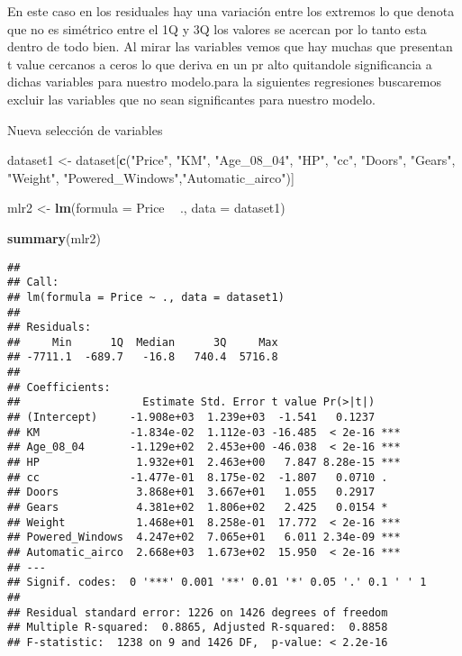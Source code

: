 \documentclass[
]{article}
\newenvironment{Shaded}{\begin{snugshade}}{\end{snugshade}}
\newcommand{\DataTypeTok}[1]{\textcolor[rgb]{0.13,0.29,0.53}{#1}}
\newcommand{\KeywordTok}[1]{\textcolor[rgb]{0.13,0.29,0.53}{\textbf{#1}}}
\newcommand{\NormalTok}[1]{#1}
\newcommand{\OperatorTok}[1]{\textcolor[rgb]{0.81,0.36,0.00}{\textbf{#1}}}
\newcommand{\StringTok}[1]{\textcolor[rgb]{0.31,0.60,0.02}{#1}}
\begin{document}
En este caso en los residuales hay una variación entre los extremos lo
que denota que no es simétrico entre el 1Q y 3Q los valores se acercan
por lo tanto esta dentro de todo bien. Al mirar las variables vemos que
hay muchas que presentan t value cercanos a ceros lo que deriva en un pr
alto quitandole significancia a dichas variables para nuestro
modelo.para la siguientes regresiones buscaremos excluir las variables
que no sean significantes para nuestro modelo.

Nueva selección de variables

\begin{Shaded}
\begin{Highlighting}[]
\NormalTok{dataset1 <-}\StringTok{ }\NormalTok{dataset[}\KeywordTok{c}\NormalTok{(}\StringTok{"Price"}\NormalTok{, }\StringTok{"KM"}\NormalTok{, }\StringTok{"Age_08_04"}\NormalTok{, }\StringTok{"HP"}\NormalTok{, }\StringTok{"cc"}\NormalTok{, }\StringTok{"Doors"}\NormalTok{, }\StringTok{"Gears"}\NormalTok{, }\StringTok{"Weight"}\NormalTok{,}
                      \StringTok{"Powered_Windows"}\NormalTok{,}\StringTok{"Automatic_airco"}\NormalTok{)]}
\end{Highlighting}
\end{Shaded}

\begin{Shaded}
\begin{Highlighting}[]
\NormalTok{mlr2 <-}\StringTok{ }\KeywordTok{lm}\NormalTok{(}\DataTypeTok{formula =}\NormalTok{ Price }\OperatorTok{~}\StringTok{ }\NormalTok{., }\DataTypeTok{data =}\NormalTok{  dataset1)}

\KeywordTok{summary}\NormalTok{(mlr2)}
\end{Highlighting}
\end{Shaded}

\begin{verbatim}
## 
## Call:
## lm(formula = Price ~ ., data = dataset1)
## 
## Residuals:
##     Min      1Q  Median      3Q     Max 
## -7711.1  -689.7   -16.8   740.4  5716.8 
## 
## Coefficients:
##                   Estimate Std. Error t value Pr(>|t|)    
## (Intercept)     -1.908e+03  1.239e+03  -1.541   0.1237    
## KM              -1.834e-02  1.112e-03 -16.485  < 2e-16 ***
## Age_08_04       -1.129e+02  2.453e+00 -46.038  < 2e-16 ***
## HP               1.932e+01  2.463e+00   7.847 8.28e-15 ***
## cc              -1.477e-01  8.175e-02  -1.807   0.0710 .  
## Doors            3.868e+01  3.667e+01   1.055   0.2917    
## Gears            4.381e+02  1.806e+02   2.425   0.0154 *  
## Weight           1.468e+01  8.258e-01  17.772  < 2e-16 ***
## Powered_Windows  4.247e+02  7.065e+01   6.011 2.34e-09 ***
## Automatic_airco  2.668e+03  1.673e+02  15.950  < 2e-16 ***
## ---
## Signif. codes:  0 '***' 0.001 '**' 0.01 '*' 0.05 '.' 0.1 ' ' 1
## 
## Residual standard error: 1226 on 1426 degrees of freedom
## Multiple R-squared:  0.8865, Adjusted R-squared:  0.8858 
## F-statistic:  1238 on 9 and 1426 DF,  p-value: < 2.2e-16
\end{verbatim}
\end{document}

